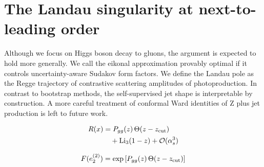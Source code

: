 \section{The Landau singularity at next-to-leading order}\label{sec:landau-singularity-nexttoleading}

Although we focus on Higgs boson decay to gluons, the argument is
expected to hold more generally. We call the eikonal approximation
provably optimal if it controls uncertainty-aware Sudakov form factors.
We define the Landau pole as the Regge trajectory of contrastive
scattering amplitudes of photoproduction. In contrast to bootstrap
methods, the self-supervised jet shape is interpretable by construction.
A more careful treatment of conformal Ward identities of Z plus jet
production is left to future work.

\begin{align}
  R(x) &= P_{gg}(z) \, \Theta(z - z_{\rm cut}) \nonumber \\
  &\quad + \mathrm{Li}_{3}(1 - z) + \mathcal{O}(\alpha_s^3) \label{eq:2}
\end{align}

\begin{equation}
  F(e_2^{(2)}) = \exp\left[P_{gg}(z) \, \Theta(z - z_{\rm cut})\right]
  \label{eq:4}
\end{equation}

